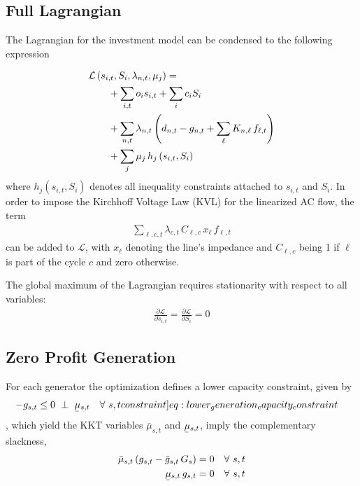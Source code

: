 \documentclass[11pt,twocolumn]{article}
\newcommand{\ubar}[1]{\underaccent{\bar}{#1}}
\newcommand{\resultsin}[1]{\hspace{6pt} \bot  \hspace{6pt} #1}
\newcommand{\Forall}[1]{\hspace{10pt} \forall \,\, #1 }
\newcommand{\pdv}[2]{\frac{\partial #1}{\partial #2}}
\newcommand{\state}[1][i]{s_{#1,t}}
\newcommand{\capacity}{S_{i}}
\newcommand{\generation}{g_{s,t}}
\newcommand{\generationpotential}{\bar{g}_{s,t}}
\newcommand{\nodalgeneration}[1][n]{g_{#1,t}}
\newcommand{\capacitygeneration}{G_{s}}
\newcommand{\mulowergeneration}{\ubar{\mu}_{s,t}}
\newcommand{\muuppergeneration}{\bar{\mu}_{s,t}}
\newcommand{\flow}{f_{\ell,t}}
\newcommand{\lagrangian}{\mathcal{L}}
\newcommand{\lmp}[1][n]{\lambda_{#1,t}}
\newcommand{\demand}[1][n]{d_{#1,t}}
\newcommand{\incidence}[1][n]{K_{#1,\ell}}
\newcommand{\cycle}{C_{\ell,c}}
\newcommand{\reactance}{x_\ell}
\newcommand{\cycleprice}{\lambda_{c,t}}
\begin{document}
\subsection{Full Lagrangian}
\label{sec:full_lagrangian}
The Lagrangian for the investment model can be condensed to the following expression

\begin{align}
\notag
& \lagrangian\left(\state, \capacity, \lmp, \mu_j \right) = \\ 
\notag
& \qquad + \sum_{i,t} o_i \state + \sum_{i} c_i \capacity  \\
\notag
&\qquad +  \sum_{n,t} \lmp \left( \demand - \nodalgeneration + \sum_\ell \incidence \, \flow \right) \\
&\qquad + \sum_j \mu_j \, h_j \left(\state, \capacity \right)
\label{eq:full_lagrangian}
\end{align}
where $h_j \left(\state, \capacity \right)$ denotes all inequality constraints attached to $\state$ and $\capacity$. In order to impose the Kirchhoff Voltage Law (KVL) for the linearized AC flow, the term 
\begin{align}
    \sum_{\ell,c,t} \cycleprice \, \cycle \, \reactance \, \flow 
\end{align}
can be added to $\lagrangian$, with $\reactance$ denoting the line's impedance and $\cycle$ being 1 if $\ell$ is part of the cycle $c$ and zero otherwise.

The global maximum of the Lagrangian requires stationarity with respect to all variables:
\begin{align}
    \pdv{\lagrangian}{\state} = \pdv{\lagrangian}{\capacity} = 0    
\end{align} 



\subsection{Zero Profit Generation}
\label{sec:zero_profit_generation}
For each generator the optimization defines a lower capacity constraint, given by 
\begin{align}
    - \generation &\le 0 \resultsin{\mulowergeneration} \Forall{s,t} 
    \label[constraint]{eq:lower_generation_capacity_constraint}
\end{align} 
, which yield the KKT variables $\muuppergeneration$ and $\mulowergeneration$, imply the complementary slackness,
\begin{align}
\muuppergeneration \left( \generation - \generationpotential \, \capacitygeneration \right)  &= 0  \Forall{s,t} 
\label{eq:complementary_slackness_upper_generation} \\
\mulowergeneration  \, \generation &= 0 \Forall{s,t}
\label{eq:complementary_slackness_lower_generation} 
\end{align}
\end{document}
